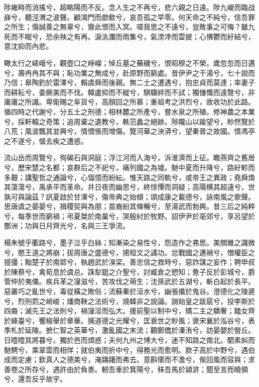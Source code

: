 \begin{pinyinscope}
陟雍畤而消搖兮，超略陽而不反。念人生之不再兮，悲六親之日遠。陟九嵕而臨战嶭兮，聽涇渭之波聲。顧鴻門而歔欷兮，哀吾孤之早零。何天命之不純兮，信吾罪之所生；傷誠善之無辜兮，齎此恨而入冥。嗟我思之不遠兮，豈敗事之可悔？雖九死而不眠兮，恐余殃之有再。淚汍瀾而雨集兮，氣滂浡而雲披；心怫鬱而紆結兮，意沈抑而內悲。

瞰太行之嵯峨兮，觀壺口之崢嶸；悼丘墓之蕪穢兮，恨昭穆之不榮。歲忽忽而日邁兮，壽冉冉其不與；恥功業之無成兮，赴原野而窮處。昔伊尹之干湯兮，七十說而乃信；皋陶釣於雷澤兮，賴虞舜而後親。無二士之遭遇兮，抱忠貞而莫達；率妻子而耕耘兮，委厥美而不伐。韓盧抑而不縱兮，騏驥絆而不試；獨慷慨而遠覽兮，非庸庸之所識。卑衛賜之阜貨兮，高顏回之所慕；重祖考之洪烈兮，故收功於此路。循四時之代謝兮，分五土之刑德；相林麓之所產兮，嘗水泉之所殖。修神農之本業兮，採軒轅之奇策；追周棄之遺教兮，軼范蠡之絕跡。陟隴山以踰望兮，眇然覽於八荒；風波飄其並興兮，情惆悵而增傷。覽河華之泱漭兮，望秦晉之故國。憤馮亭之不遂兮，慍去疾之遭惑。

流山岳而周覽兮，徇碣石與洞庭；浮江河而入海兮，泝淮濟而上征。瞻燕齊之舊居兮，歷宋楚之名都；哀群后之不祀兮，痛列國之為墟。馳中夏而升降兮，路紆軫而多艱；講聖哲之通論兮，心愊憶而紛紜。惟天路之同軌兮，或帝王之異政；堯舜煥其蕩蕩兮，禹承平而革命。并日夜而幽思兮，終悇憛而洞疑；高陽横其超遠兮，世孰可與論茲？訊夏啟於甘澤兮，傷帝典之始傾；頌成康之載德兮，詠南風之歌聲。思唐虞之晏晏兮，揖稷契與為朋；苗裔紛其條暢兮，至湯武而勃興。昔三后之純粹兮，每季世而窮禍；弔夏桀於南巢兮，哭殷紂於牧野。詔伊尹於亳郊兮，享呂望於酆洲；功與日月齊光兮，名與三王爭流。

楊朱號乎衢路兮，墨子泣乎白絲；知漸染之易性兮，怨造作之弗思。美關雎之識微兮，愍王道之將崩；拔周唐之盛德兮，捃桓文之譎功。忿戰國之遘禍兮，憎權臣之擅彊；黜楚子於南郢兮，執趙武於湨梁。善忠信之救時兮，惡詐謀之妄作；聘申叔於陳蔡兮，禽荀息於虞总。誅犁鉏之介聖兮，討臧倉之愬知；惫子反於彭城兮，爵管仲於夷儀。疾兵革之寖滋兮，苦攻伐之萌生；沈孫武於五湖兮，斬白起於長平。惡叢巧之亂世兮，毒從橫之敗俗；流蘇秦於洹水兮，幽張儀於鬼谷。澄德化之陵遲兮，烈刑罰之峭峻；燔商鞅之法術兮，燒韓非之說論。誚始皇之跋扈兮，投李斯於四裔；滅先王之法則兮，禍寖淫而弘大。援前聖以制中兮，矯二主之驕奢；饁女齊於絳臺兮，饗椒舉於章華。摛道德之光耀兮，匡衰世之眇風；褒宋襄於泓谷兮，表季札於延陵。摭仁智之英華兮，激亂國之末流；觀鄭僑於溱洧兮，訪晏嬰於營丘。日曀曀其將暮兮，獨於邑而煩惑；夫何九州之博大兮，迷不知路之南北。駟素虯而馳騁兮，乘翠雲而相佯；就伯夷而折中兮，得務光而愈明。款子高於中野兮，遇伯成而定慮；欽真人之德美兮，淹躊躇而弗去。意斟愖而不澹兮，俟回風而容與；求善卷之所存兮，遇許由於負黍。軔吾車於箕陽兮，秣吾馬於潁滸；聞至言而曉領兮，還吾反乎故宇。


\end{pinyinscope}
